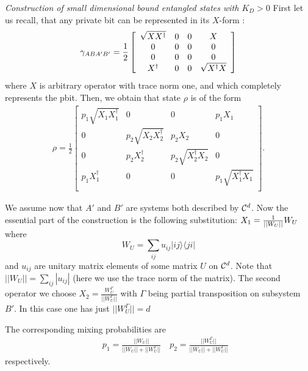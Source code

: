 \documentclass[twocolumn,prl,aps]{revtex4}
\begin{document}
{\it Construction of small dimensional bound entangled states with $K_D>0$}
First let us recall, that any private bit can be represented in its $X$-form \cite{keyhuge}:
\begin{eqnarray}
\gamma_{ABA'B'}={1\over 2}\left[
\begin{array}{cccc}
\sqrt{XX^{\dagger}} &0&0& X \\
0& 0&0&0 \\
0&0&0& 0\\
X^{\dagger}&0&0& \sqrt{X^{\dagger}X}\\
\end{array}
\right]
\label{xform}
\end{eqnarray}
where $X$ is arbitrary operator with trace norm one, 
and which completely represents the pbit. Then, we obtain that state 
$\rho$ is of the form 
\begin{eqnarray}
\rho= \frac{1}{2}\left[ \begin{array}{cccc}
p_{1}\sqrt{X_{1}X_{1}^{\dagger}} & 0 & 0 & p_{1}X_{1} \\
0 & p_{2}\sqrt{X_{2}X_{2}^{\dagger}}& p_{2} X_{2} & 0 \\
0 & p_{2}X_{2}^{\dagger} & p_{2} \sqrt{X_{2}^{\dagger}X_{2}} & 0\\
p_{1}X_{1}^{\dagger} & 0 & 0 & p_{1}\sqrt{X_{1}^{\dagger} X_{1}}\\
\end{array}
\right].
\label{standform}
\end{eqnarray}

We assume now that $A'$ and $B'$ are systems both described 
by ${\cal C}^{d}$. Now the essential part of the construction 
is the following substitution: $X_{1} = {1\over ||W_U||}W_U $
where
\begin{equation}
W_U=\sum_{ij}u_{ij} |ij\rangle \langle ji| 
\end{equation}
and $u_{ij}$ are unitary matrix elements of some matrix
$U$ on ${\cal C}^{d}$. Note that $|| W_U||=\sum_{ij}|u_{ij}|$
(here we use the trace norm of the matrix).
The second operator we choose 
$X_{2} = \frac{W_U^{\Gamma}}{||W_U^{\Gamma}||}$ with
$\Gamma$ being partial transposition on subsystem $B'$. In this case
one has just $||W_U^{\Gamma}||=d$

The corresponding mixing probabilities are
\begin{eqnarray}
&& p_{1}=\frac{||W_U||}{||W_U||+||W_U^{\Gamma}||}\quad 
p_{2}=\frac{||W_U^{\Gamma}||}{||W_U||+||W_U^{\Gamma}||} 
\end{eqnarray}
respectively.
\end{document}

